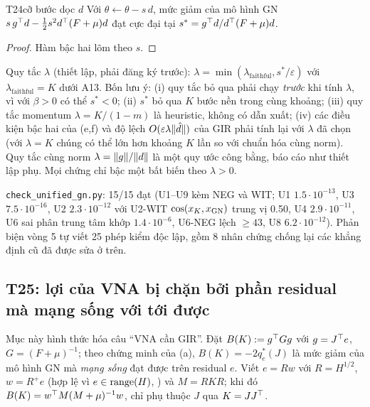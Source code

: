 \begin{namedthm}{T24}{cỡ bước dọc $d$}
Với $\theta\leftarrow\theta-s\,d$, mức giảm của mô hình GN $s\,g^{\top} d-\tfrac12s^2d^{\top}(F+\mu)d$ đạt cực đại tại $s^*=g^{\top} d/d^{\top}(F+\mu)d$.
\end{namedthm}
\begin{proof}
Hàm bậc hai lõm theo $s$.
\end{proof}
\begin{hequa}
Quy tắc $\lambda$ (thiết lập, phải đăng ký trước): $\lambda=\min(\lambda_{\mathrm{faithful}},s^*/\varepsilon)$ với $\lambda_{\mathrm{faithful}}=K$ dưới A13. Bốn lưu ý: (i) quy tắc bỏ qua phải chạy \emph{trước} khi tính $\lambda$, vì với $\beta>0$ có thể $s^*<0$; (ii) $s^*$ bỏ qua $K$ bước nền trong cùng khoảng; (iii) quy tắc momentum $\lambda=K/(1-m)$ là heuristic, không có dẫn xuất; (iv) các điều kiện bậc hai của (e,f) và độ lệch $O(\varepsilon\lambda\lVert \hat d\rVert)$ của GIR phải tính lại với $\lambda$ đã chọn (với $\lambda=K$ chúng có thể lớn hơn khoảng $K$ lần so với chuẩn hóa cùng norm). Quy tắc cùng norm $\lambda=\lVert g\rVert/\lVert d\rVert$ là một quy ước công bằng, báo cáo như thiết lập phụ. Mọi chứng chỉ bậc một bất biến theo $\lambda>0$.
\end{hequa}

\begin{kiem}
\texttt{check\_unified\_gn.py}: 15/15 đạt (U1--U9 kèm NEG và WIT; U1 $1.5\cdot10^{-13}$, U3 $7.5\cdot10^{-16}$, U2 $2.3\cdot10^{-12}$ với U2-WIT $\cos(x_K,x_{\mathrm{GN}})$ trung vị 0.50, U4 $2.9\cdot10^{-11}$, U6 sai phân trung tâm khớp $1.4\cdot10^{-6}$, U6-NEG lệch $\ge43$, U8 $6.2\cdot10^{-12}$). Phản biện vòng 5 tự viết 25 phép kiểm độc lập, gồm 8 nhân chứng chống lại các khẳng định cũ đã được sửa ở trên.
\end{kiem}

\subsection{T25: lợi của VNA bị chặn bởi phần residual mà mạng sống với tới được}

Mục này hình thức hóa câu ``VNA cần GIR''. Đặt $B(K):=g^{\top} Gg$ với $g=J^{\top} e$, $G=(F+\mu)^{-1}$; theo chứng minh của (a), $B(K)=-2q^*_e(J)$ là mức giảm của mô hình GN mà \emph{mạng sống} đạt được trên residual $e$. Viết $e=Rw$ với $R=H^{1/2}$, $w=R^+e$ (hợp lệ vì $e\in\operatorname{range}(H)$, ) và $M=RKR$; khi đó $B(K)=w^{\top} M(M+\mu)^{-1}w$, chỉ phụ thuộc $J$ qua $K=JJ^{\top}$.

